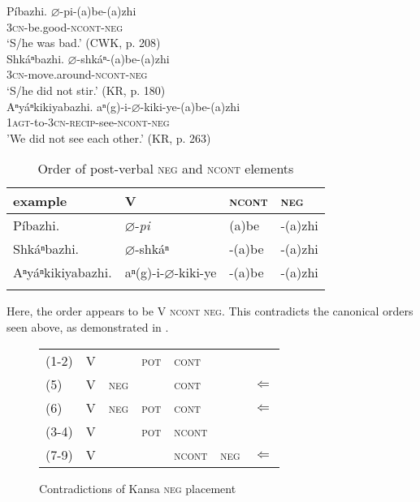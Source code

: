 \documentclass[output=paper]{LSP/langsci}
\begin{document}
\ea\label{negncont}
\ea \label{negncont1}{P\'ibazhi.
\gll 
$\varnothing$-pi-(a)be-(a)zhi\\
\textsc{3cn}-be.good-\textsc{ncont}-\textsc{neg}\\
\glt `S/he was bad.' (CWK, p. 208) \\
}
\ex \label{negncont2}{Shk\'aⁿbazhi.
\gll 
$\varnothing$-shk\'aⁿ-(a)be-(a)zhi \\
\textsc{3cn}-move.around-\textsc{ncont}-\textsc{neg} \\
\glt `S/he did not stir.' (KR, p. 180) \\
}
\ex \label{negncont3}{Aⁿy\'aⁿkikiyabazhi.
\gll 
aⁿ(g)-i-$\varnothing$-kiki-ye-(a)be-(a)zhi \\
\textsc{1agt}-to-\textsc{3cn}-\textsc{recip}-see-\textsc{ncont}-\textsc{neg} \\
\gll 'We did not see each other.' (KR, p. 263) \\
}
\z 
\z

\begin{table}
\caption{Order of post-verbal \textsc{neg} and \textsc{ncont} elements} \label{tablenegncont}
\begin{tabular}[h!]{ l l l l }
\lsptoprule
example & V & \textsc{ncont} & \textsc{neg} \\
\midrule
P\'ibazhi. & $\varnothing$-\textit{pi}	& (a)be	& -(a)zhi \\
Shk\'aⁿbazhi. & $\varnothing$-shk\'aⁿ & -(a)be & -(a)zhi \\
Aⁿy\'aⁿkikiyabazhi. & aⁿ(g)-i-$\varnothing$-kiki-ye & -(a)be & -(a)zhi \\
\lspbottomrule
\end{tabular}
\end{table}
 
Here, the order appears to be V \textsc{ncont neg}. This contradicts the canonical orders seen above, as demonstrated in .

\begin{figure}
\caption{Contradictions of Kansa \textsc{neg} placement} \label{contradictions}
\begin{tabular}{ l l l l l l l }
(1-2) & V & & \textsc{pot} & \textsc{cont} & & \\
(5) & V & \textsc{neg} & & \textsc{cont} & & $\Leftarrow$ \\
(6) & V & \textsc{neg} & \textsc{pot} & \textsc{cont} & & $\Leftarrow$ \\
(3-4) & V & & \textsc{pot} & \textsc{ncont} & & \\
(7-9) & V & & & \textsc{ncont} & \textsc{neg} & $\Leftarrow$ \\
\end{tabular}
\end{figure}
\end{document}
